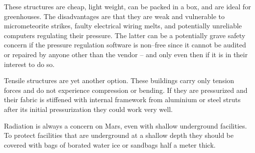 These structures are cheap, light weight, can be packed in a box, and are ideal for greenhouses. The disadvantages are that they are weak and vulnerable to micrometeorite strikes, faulty electrical wiring melts, and potentially unreliable computers regulating their pressure. The latter can be a potentially grave safety concern if the pressure regulation software is non--free since it cannot be audited or repaired by anyone other than the vendor -- and only even then if it is in their interest to do so.

Tensile structures are yet another option. These buildings carry only tension forces and do not experience compression or bending. If they are pressurized and their fabric is stiffened with internal framework from aluminium or steel struts after its initial pressurization they could work very well.

Radiation is always a concern on Mars, even with shallow underground facilities. To protect facilities that are underground at a shallow depth they should be covered with bags of borated water ice or sandbags half a meter thick.

